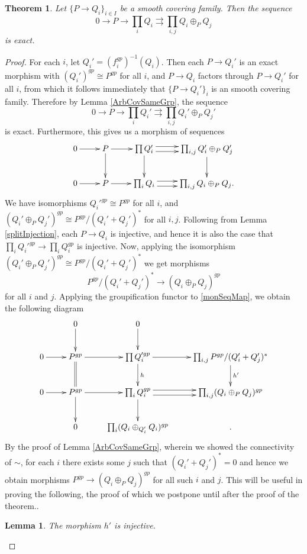 \documentclass[12pt]{amsart}
\numberwithin{equation}{section}
\theoremstyle{plain}
\newtheorem{thm}[equation]{Theorem}
\newtheorem{lem}[equation]{Lemma}
\theoremstyle{remark}
\begin{document}
\begin{thm}\label{monoidDescent}
	Let $\{P\to Q_i\}_{i\in I}$ be a smooth covering family. Then the sequence
		$$0\to  P\to \prod_i Q_i\rightrightarrows \prod_{i,j}Q_i\oplus_P Q_j$$
is exact. 
\end{thm}
\begin{proof}
For each $i$, let $Q_i' = (f_i^{gp})^{-1}(Q_i)$. Then each $P\to Q_i'$ is an exact morphism with $(Q_i')^{gp} \cong P^{gp}$ for all $i$, and $P\to Q_i$ factors through $P\to Q_i'$ for all $i$, from which it follows immediately that $\{P\to Q_i'\}_i$ is an smooth covering family. Therefore by Lemma \eqref{ArbCovSameGrp}, the sequence
	$$0\to P\to \prod_i Q_i'\rightrightarrows \prod_{i,j} Q_i'\oplus_P Q_j'$$
is exact. Furthermore, this gives us a morphism of sequences
\begin{equation}\label{monSeqMap}
	\xymatrix{
		0 \ar[r] & P\ar[r]\ar[d] & \prod Q_i' \ar@<-.25pc>[r]\ar@<.25pc>[r]\ar[d] & \prod_{i,j} Q_i'\oplus_P Q_j'\ar[d]\\
		0 \ar[r] & P \ar[r] & \prod_i Q_i\ar@<.25pc>[r] \ar@<-.25pc>[r] & \prod_{i,j} Q_i\oplus_P Q_j.\\
	}
\end{equation}
We have isomorphisms $Q_i'^{gp}\cong P^{gp}$ for all $i$, and $(Q_i'\oplus_P Q_j')^{gp} \cong P^{gp}/(Q_i' + Q_j')^*$ for all $i,j$. Following from Lemma \eqref{splitInjection}, each $P\to Q_i$ is injective, and hence it is also the case that $\prod_i Q_i'^{gp}\to \prod_i Q_i^{gp}$ is injective. Now, applying the isomorphism $(Q_i' \oplus_P Q_j')^{gp} \cong P^{gp}/(Q_i' + Q_j')^*$ we get morphisms
	$$P^{gp}/(Q_i' + Q_j')^* \to (Q_i\oplus_P Q_j)^{gp}$$
for all $i$ and $j$. Applying the groupification functor to \eqref{monSeqMap}, we obtain the following diagram
\begin{equation}\label{groupSequence}
	\xymatrix{
		 & 0\ar[d] & 0\ar[d] & \\
		0 \ar[r] & P^{gp}\ar[r]\ar@{=}[d] & \prod Q_i'^{gp} \ar[r]\ar^{h}[d] & \prod_{i,j} P^{gp}/(Q_i'+Q_j')^*\ar^{h'}[d]\\
		0 \ar[r] & P^{gp} \ar[r]\ar[d] & \prod_i Q_i^{gp}\ar@<.25pc>[r] \ar@<-.25pc>[r]\ar[d] & \prod_{i,j} (Q_i\oplus_P Q_j)^{gp}\\
		& 0 & \prod_i (Q_i\oplus_{Q_i'} Q_i)^{gp} & .\\
	}
\end{equation}
By the proof of Lemma \eqref{ArbCovSameGrp}, wherein we showed the connectivity of $\sim$, for each $i$ there exists some $j$ such that $(Q_i' + Q_j')^* = 0$ and hence we obtain morphisms $P^{gp}\to (Q_i \oplus_P Q_j)^{gp}$ for all such $i$ and $j$. This will be useful in proving the following, the proof of which we postpone until after the proof of the theorem..
\begin{lem}\label{injMorphism}
	The morphism $h'$ is injective.
\end{lem}	


\end{proof}
\end{document}
